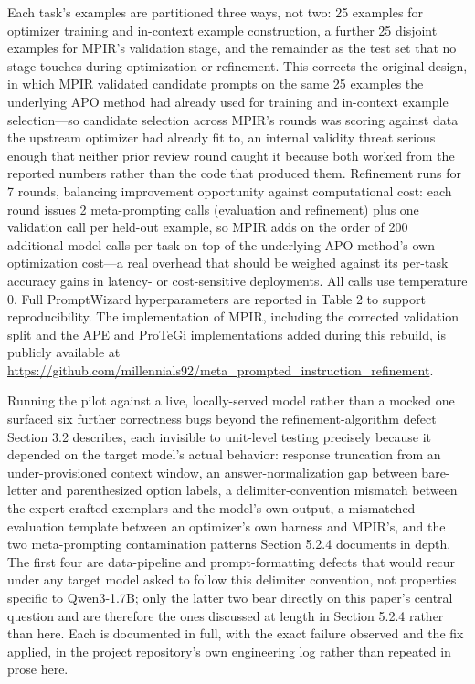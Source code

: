 \documentclass[a4paper,fleqn]{cas-sc}
\begin{document}
Each task's examples are partitioned three ways, not two: 25 examples for optimizer training and in-context example construction, a further 25 disjoint examples for MPIR's validation stage, and the remainder as the test set that no stage touches during optimization or refinement. This corrects the original design, in which MPIR validated candidate prompts on the same 25 examples the underlying APO method had already used for training and in-context example selection---so candidate selection across MPIR's rounds was scoring against data the upstream optimizer had already fit to, an internal validity threat serious enough that neither prior review round caught it because both worked from the reported numbers rather than the code that produced them. Refinement runs for 7 rounds, balancing improvement opportunity against computational cost: each round issues 2 meta-prompting calls (evaluation and refinement) plus one validation call per held-out example, so MPIR adds on the order of 200 additional model calls per task on top of the underlying APO method's own optimization cost---a real overhead that should be weighed against its per-task accuracy gains in latency- or cost-sensitive deployments. All calls use temperature 0. Full PromptWizard hyperparameters are reported in Table 2 to support reproducibility. The implementation of MPIR, including the corrected validation split and the APE and ProTeGi implementations added during this rebuild, is publicly available at \url{https://github.com/millennials92/meta_prompted_instruction_refinement}.

Running the pilot against a live, locally-served model rather than a mocked one surfaced six further correctness bugs beyond the refinement-algorithm defect Section 3.2 describes, each invisible to unit-level testing precisely because it depended on the target model's actual behavior: response truncation from an under-provisioned context window, an answer-normalization gap between bare-letter and parenthesized option labels, a delimiter-convention mismatch between the expert-crafted exemplars and the model's own output, a mismatched evaluation template between an optimizer's own harness and MPIR's, and the two meta-prompting contamination patterns Section 5.2.4 documents in depth. The first four are data-pipeline and prompt-formatting defects that would recur under any target model asked to follow this delimiter convention, not properties specific to Qwen3-1.7B; only the latter two bear directly on this paper's central question and are therefore the ones discussed at length in Section 5.2.4 rather than here. Each is documented in full, with the exact failure observed and the fix applied, in the project repository's own engineering log rather than repeated in prose here.
\end{document}
